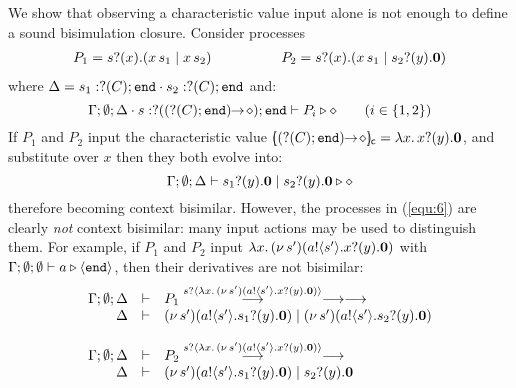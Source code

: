 \begin{example}
	\label{ex:motivation}
	We show that observing a characteristic value
	input alone is not enough
	to define a sound bisimulation closure.
	Consider   processes %
%
	\begin{eqnarray}
		P_1 = s ? (x) . (x\, {s_1} \;|\; x\, {s_2}) 
		&\qquad \qquad& 
		P_2 = s ? (x) . (x\, {s_1} \;|\; s_2 ? (y) . \mathbf{0}) 
		\label{equ:6}
	\end{eqnarray}
%
	where $\Delta = s_1: ? (C) ; \mathtt{end} \cdot s_2: ? (C) ; \mathtt{end}$ and:
%
	\[
		\Gamma; \emptyset; \Delta \cdot s: ? ((? (C) ; \mathtt{end})\!\! \rightarrow\! \diamond) ; \mathtt{end} \vdash P_i \triangleright \diamond \qquad (i \in \{1,2\})
	\]
%
	If $P_1$ and $P_2$ input 
	the characteristic value $[\!\!((? (C) ; \mathtt{end})\!\! \rightarrow\! \diamond)\!\!]_{\mathsf{c}} = \lambda x.\,x ? (y) . \mathbf{0}$, 
	and substitute over $x$ then they both evolve into:
%
	\[
		\Gamma; \emptyset; \Delta \vdash s_1 ? (y) . \mathbf{0} \;|\; s_2 ? (y) . \mathbf{0} \triangleright \diamond
	\]
%
	\noi therefore becoming context bisimilar.
	However, the processes in (\ref{equ:6}) 
	are clearly {\em not} context bisimilar: many input actions
	may be used to distinguish them.
	For example, if  $P_1$ and $P_2$ input
%
	$\lambda x.\,(\nu\, s')(a ! \langle s' \rangle . x ? (y) . \mathbf{0})$
%
	with
%
	$\Gamma; \emptyset; \emptyset \vdash a \triangleright \langle \mathtt{end} \rangle$,
%
	then their derivatives are not bisimilar:
%
\[
	\begin{array}{rcll}
		\Gamma; \emptyset; \Delta &\vdash& P_1 \stackrel{s ? \langle \lambda x.\,(\nu\, s')(a ! \langle s' \rangle . x ? (y) . \mathbf{0}) \rangle}{\longrightarrow} \longrightarrow \longrightarrow\\
		\Delta &\vdash& (\nu\, s')(a ! \langle s' \rangle . s_1 ? (y) . \mathbf{0}) \;|\; (\nu\, s')(a ! \langle s' \rangle . s_2 ? (y) . \mathbf{0})
		\\[4mm]
		\Gamma; \emptyset; \Delta &\vdash& P_2 \stackrel{s ? \langle \lambda x.\,(\nu\, s')(a ! \langle s' \rangle . x ? (y) . \mathbf{0}) \rangle}{\longrightarrow} \longrightarrow\\
		\Delta &\vdash& (\nu\, s')(a ! \langle s' \rangle . s_1 ? (y) . \mathbf{0}) \;|\; s_2 ? (y) . \mathbf{0}
	\end{array}
\]


\end{example}
